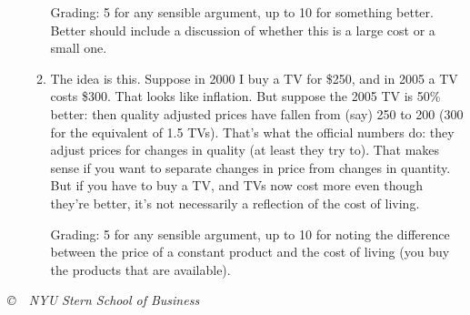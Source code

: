 \documentclass[letterpaper,12pt]{article}
\begin{document}
\begin{enumerate}
\begin{enumerate}
Grading:  5 for any sensible argument, 
up to 10 for something better. 
Better should include a discussion of whether this is a large 
cost or a small one.  

\item The idea is this.  Suppose in 2000 I buy a TV for \$250, 
and in 2005 a TV costs \$300.  That looks like inflation.
But suppose the 2005 TV is 50\% better:  then quality adjusted prices
have fallen from (say) 250 to 200 
(300 for the equivalent of 1.5 TVs).  
That's what the official numbers do:  they adjust prices 
for changes in quality (at least they try to). 
That makes sense if you want to separate changes in price from changes in quantity.  
But if you have to buy a TV, and TVs now cost more even though they're better, 
it's not necessarily a reflection of the cost of living.  

Grading:  5 for any sensible argument, 
up to 10 for noting the difference between 
the price of a constant product and the cost of living 
(you buy the products that are available). 

\end{enumerate}

\end{enumerate}


\vfill \centerline{\it \copyright \ \number\year \ NYU Stern
School of Business}
\end{document}
